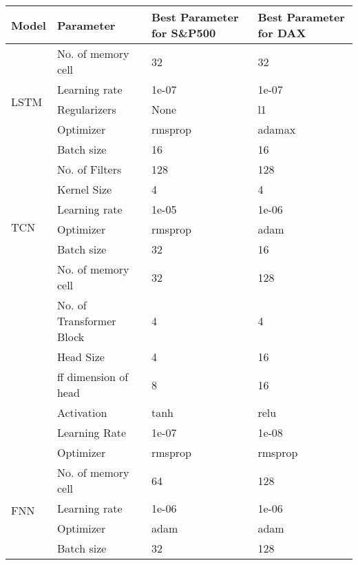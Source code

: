 \documentclass{article}
\begin{document}
\begin{table}[!h]
\centering
\small

\begin{tabular}{|p{1.8cm}|p{3.8cm}|p{4.5cm}|p{4.5cm}|}
\hline
Model & Parameter & Best Parameter for S\&P500 &  Best Parameter for DAX \\
\hline
\multirow{5}{*}{LSTM} & No. of memory cell & 32 & 32 \\ \cline{2-4}
                      & Learning rate      & 1e-07 & 1e-07 \\ \cline{2-4}
                      & Regularizers       & None & l1 \\ \cline{2-4}
                      & Optimizer          & rmsprop & adamax \\ \cline{2-4}
                      & Batch size         & 16 & 16 \\ \hline
\multirow{6}{*}{TCN} & No. of Filters & 128 & 128 \\ \cline{2-4}
                     & Kernel Size & 4 & 4 \\ \cline{2-4}
                      & Learning rate      & 1e-05 & 1e-06 \\ \cline{2-4}
                      & Optimizer          & rmsprop & adam \\ \cline{2-4}
                      & Batch size         & 32 & 16 \\ \hline
\multirow{7}{*}{Transformer} & No. of memory cell & 32 & 128 \\ \cline{2-4}
                      & No. of Transformer Block & 4 & 4 \\ \cline{2-4}
                      & Head Size      & 4 & 16 \\ \cline{2-4}
                      & ff dimension of head  & 8 & 16 \\ \cline{2-4}
                      & Activation          & tanh & relu \\ \cline{2-4}
                      & Learning Rate       & 1e-07 & 1e-08 \\ \cline{2-4}
                      & Optimizer          & rmsprop & rmsprop \\ \hline
\multirow{4}{*}{FNN} & No. of memory cell & 64 & 128 \\ \cline{2-4}
                      & Learning rate      & 1e-06 & 1e-06 \\ \cline{2-4}
                      & Optimizer          & adam & adam \\ \cline{2-4}
                      & Batch size         & 32 & 128 \\ \hline

\end{tabular}
\end{table}
\end{document}
